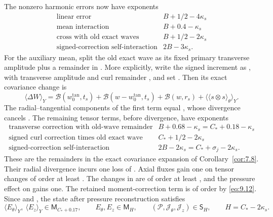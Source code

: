 The nonzero harmonic errors now have exponents
\[
\begin{array}{r|l}
\text{linear error} & B+1/2-4\kappa_s\\
\text{mean interaction} & B+0.4-\kappa_s\\
\text{cross with old exact waves} & B+1/2-2\kappa_s\\
\text{signed-correction self-interaction} & 2B-3\kappa_s.
\end{array}
\]
For the auxiliary mean, split the old exact wave as its fixed primary transverse amplitude plus a
remainder in . More explicitly, write the signed increment as
, with transverse amplitude  and curl
remainder , and set
.
Then its exact covariance change is
\begin{equation}
\langle\Delta W\rangle_Y
=\mathscr B(w_0^{\tan},t_s)+\mathscr B(w-w_0^{\tan},t_s)
 +\mathscr B(w,r_s)+\langle\langle s\otimes s\rangle_\theta\rangle_Y.
\tag{9.13}\label{eq:9.13}
\end{equation}
The radial--tangential components of the first term equal , whose
divergence cancels . The remaining tensor terms, before
divergence, have exponents
\[
\begin{array}{r|l}
\text{transverse correction with old-wave remainder}
  & B+0.68-\kappa_s=C_*+0.18-\kappa_s\\
\text{signed curl correction times old exact wave}
  & C_*+1/2-2\kappa_s\\
\text{signed-correction self-interaction}
  & 2B-2\kappa_s=C_*+\sigma_j-2\kappa_s.
\end{array}
\]
These are the remainders in the exact covariance expansion of Corollary~\ref{cor:7.8}. Their
radial divergence incurs one loss of . Axial fluxes gain one on
tensor changes of order at least . The changes in
 are of order at least
, and the pressure effect on 
gains one. The retained moment-correction term  is of order
 by \eqref{eq:9.12}. Since
%
 and
, the state after pressure reconstruction satisfies
\begin{equation}
\langle E_\theta\rangle_Y,\ \langle E_z\rangle_Y\in \mathsf M_{C_*+0.17},
\qquad E_\theta,E_z\in \mathsf M_H,
\qquad (\mathcal P,\mathcal J_\theta,\mathcal J_z)\in \mathsf S_H,
\qquad H=C_*-2\kappa_s.
\tag{9.14}\label{eq:9.14}
\end{equation}

